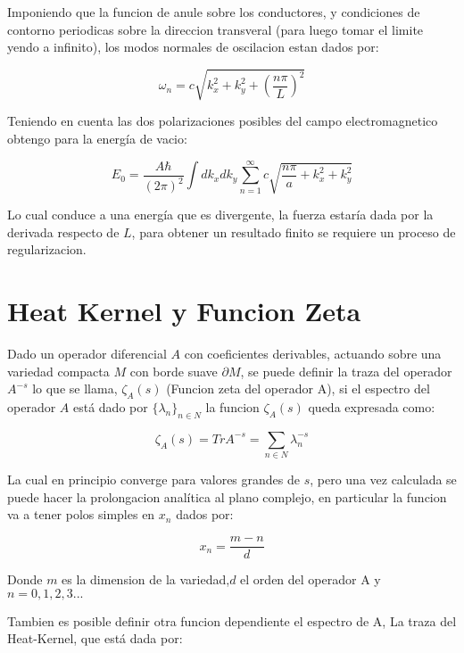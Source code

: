 Imponiendo que la funcion de anule sobre los conductores, y condiciones de contorno periodicas sobre la direccion transveral (para luego tomar el limite yendo a infinito), los modos normales de oscilacion estan dados por:

\begin{equation}
\omega _n = c \sqrt{ k _x ^2 + k _y ^2 + \left( \frac{n \pi}{L} \right) ^2 }
\end{equation}

Teniendo en cuenta las dos polarizaciones posibles del campo electromagnetico obtengo para la energía de vacio:

\begin{equation}
E _0 = \frac{A \hbar }{(2 \pi) ^2} \int dk _x dk _y 
\sum _{n=1} ^{\infty} 
c
\sqrt{
		\frac{n \pi}{a } + k _x ^2 + k _y ^2
		}
\end{equation}


Lo cual conduce a una energía que es divergente, la fuerza estaría dada por la derivada respecto de $L$, para obtener un resultado finito se requiere un proceso de regularizacion.

\section{Heat Kernel y Funcion Zeta}

Dado un operador diferencial $A$ con coeficientes derivables, actuando sobre una variedad compacta $M$ con borde suave $\partial M$, se puede definir la traza del operador $A ^{-s}$ lo que se llama, $\zeta _A (s)$ (Funcion zeta del operador A), si el espectro del operador $A$ está dado por $ \{ \lambda _n \} _{n \in N}$ la funcion $\zeta _A (s)$ queda expresada como:


\begin{equation}
\zeta _A (s) = Tr A ^{-s} = \sum _{n \in N}  \lambda _n ^{-s}
\end{equation}

La cual en principio converge para valores grandes de $s$, pero una vez calculada se puede hacer la prolongacion analítica al plano complejo, en particular la funcion va a tener polos simples en $x _n$ dados por:

\begin{equation}
x _n = \frac{m-n}{d} 
\end{equation}

Donde $m$ es la dimension de la variedad,$d$ el orden del operador A y $n= 0,1,2,3 ...$

Tambien es posible definir otra funcion dependiente el espectro de A, La traza del Heat-Kernel, que está dada por:


